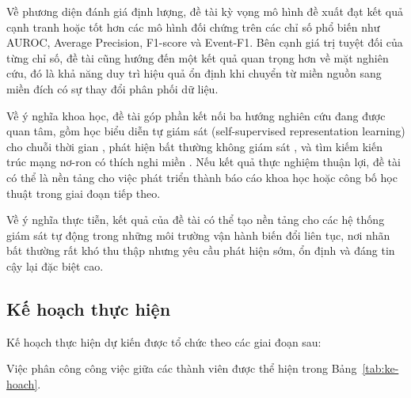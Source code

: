 \documentclass[a4paper]{article}
\begin{document}
Về phương diện đánh giá định lượng, đề tài kỳ vọng mô hình đề xuất đạt kết quả cạnh tranh hoặc tốt hơn các mô hình đối chứng trên các chỉ số phổ biến như AUROC, Average Precision, F1-score và Event-F1. Bên cạnh giá trị tuyệt đối của từng chỉ số, đề tài cũng hướng đến một kết quả quan trọng hơn về mặt nghiên cứu, đó là khả năng duy trì hiệu quả ổn định khi chuyển từ miền nguồn sang miền đích có sự thay đổi phân phối dữ liệu.

Về ý nghĩa khoa học, đề tài góp phần kết nối ba hướng nghiên cứu đang được quan tâm, gồm học biểu diễn tự giám sát (self-supervised representation learning) cho chuỗi thời gian \cite{tstcc}, phát hiện bất thường không giám sát \cite{usad, omnianomaly, anomaly_transformer, tranad}, và tìm kiếm kiến trúc mạng nơ-ron có thích nghi miền \cite{adaptnas, pasta}. Nếu kết quả thực nghiệm thuận lợi, đề tài có thể là nền tảng cho việc phát triển thành báo cáo khoa học hoặc công bố học thuật trong giai đoạn tiếp theo.

Về ý nghĩa thực tiễn, kết quả của đề tài có thể tạo nền tảng cho các hệ thống giám sát tự động trong những môi trường vận hành biến đổi liên tục, nơi nhãn bất thường rất khó thu thập nhưng yêu cầu phát hiện sớm, ổn định và đáng tin cậy lại đặc biệt cao.

\subsection{Kế hoạch thực hiện}

Kế hoạch thực hiện dự kiến được tổ chức theo các giai đoạn sau:

Việc phân công công việc giữa các thành viên được thể hiện trong Bảng~\ref{tab:ke-hoach}.
\end{document}
